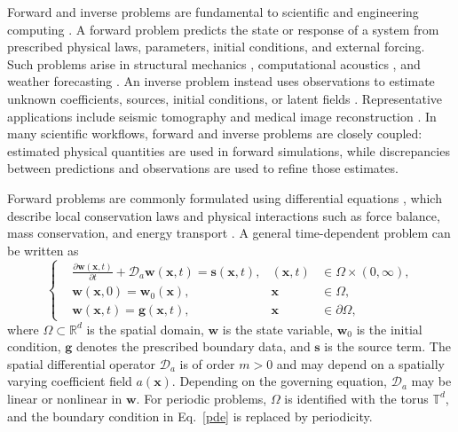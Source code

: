 \documentclass[preprint,numbers,sort&compress]{elsarticle}
\begin{document}
		Forward and inverse problems are fundamental to scientific and engineering
		computing \cite{li2025fully,tang2025optical,ding2025scitoolagent}. A forward
		problem predicts the state or response of a system from prescribed physical
		laws, parameters, initial conditions, and external forcing. Such problems
		arise in structural mechanics \cite{he2024multi}, computational acoustics
		\cite{tsakmakidis2025discovery}, and weather forecasting
		\cite{allen2025end,bauer2023deep}. An inverse problem instead uses
		observations to estimate unknown coefficients, sources, initial conditions,
		or latent fields \cite{aarts2025physics,tarantola2005inverse}. Representative
		applications include seismic tomography \cite{lyu2025efficient} and medical
		image reconstruction \cite{zhao2023energy}. In many scientific workflows,
		forward and inverse problems are closely coupled: estimated physical
		quantities are used in forward simulations, while discrepancies between
		predictions and observations are used to refine those estimates. 
		
		Forward problems are commonly formulated using differential equations \cite{carleo2019machine,brunton2024promising}, which describe local conservation laws and physical interactions such as force balance, mass conservation, and energy transport \cite{kontolati2024learning}. A general
		time-dependent problem can be written as
		\begin{equation}\label{pde}
			\left\{
			\begin{aligned}
				& \frac{\partial \boldsymbol{w}(\mathbf{x}, t)}{\partial t} + \mathcal{D}_a\boldsymbol{w}(\mathbf{x}, t) = \boldsymbol{s}(\mathbf{x}, t), & (\mathbf{x}, t) &\in \Omega \times (0, \infty), \\
				& \boldsymbol{w}(\mathbf{x}, 0) = \boldsymbol{w}_0(\mathbf{x}), & \mathbf{x} &\in \Omega, \\
				& \boldsymbol{w}(\mathbf{x}, t) = \boldsymbol{g}(\mathbf{x}, t), & \mathbf{x} &\in \partial \Omega,
			\end{aligned} 
			\right.
		\end{equation}
		where $\Omega\subset\mathbb R^{d}$ is the spatial domain,
		$\boldsymbol w$ is the state variable, $\boldsymbol w_0$ is the initial condition, $\boldsymbol g$ denotes the prescribed boundary data, and $\boldsymbol s$ is the source term. The spatial differential operator $\mathcal D_a$ is of order $m>0$ and may depend on a spatially varying coefficient field $a(\mathbf x)$. Depending on the governing equation, $\mathcal D_a$ may be linear or nonlinear in $\boldsymbol w$. For periodic problems, $\Omega$ is identified with the torus $\mathbb T^d$, and the boundary condition in Eq.~\eqref{pde} is replaced by periodicity.
		
\end{document}
